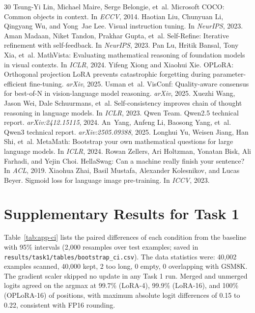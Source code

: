 \documentclass{article}
\begin{document}
\begin{thebibliography}{30}
Tsung-Yi Lin, Michael Maire, Serge Belongie, et~al. Microsoft COCO: Common objects in context. In \emph{ECCV}, 2014.
Haotian Liu, Chunyuan Li, Qingyang Wu, and Yong~Jae Lee. Visual instruction tuning. In \emph{NeurIPS}, 2023.
Aman Madaan, Niket Tandon, Prakhar Gupta, et~al. Self-Refine: Iterative refinement with self-feedback. In \emph{NeurIPS}, 2023.
Pan Lu, Hritik Bansal, Tony Xia, et~al. MathVista: Evaluating mathematical reasoning of foundation models in visual contexts. In \emph{ICLR}, 2024.
Yifeng Xiong and Xiaohui Xie. OPLoRA: Orthogonal projection LoRA prevents catastrophic forgetting during parameter-efficient fine-tuning. \emph{arXiv}, 2025.
Usman et~al. VisConf: Quality-aware consensus for best-of-N in vision-language model reasoning. \emph{arXiv}, 2025.
Xuezhi Wang, Jason Wei, Dale Schuurmans, et~al. Self-consistency improves chain of thought reasoning in language models. In \emph{ICLR}, 2023.
Qwen Team. Qwen2.5 technical report. \emph{arXiv:2412.15115}, 2024.
An~Yang, Anfeng Li, Baosong Yang, et~al. Qwen3 technical report. \emph{arXiv:2505.09388}, 2025.
Longhui Yu, Weisen Jiang, Han Shi, et~al. MetaMath: Bootstrap your own mathematical questions for large language models. In \emph{ICLR}, 2024.
Rowan Zellers, Ari Holtzman, Yonatan Bisk, Ali Farhadi, and Yejin Choi. HellaSwag: Can a machine really finish your sentence? In \emph{ACL}, 2019.
Xiaohua Zhai, Basil Mustafa, Alexander Kolesnikov, and Lucas Beyer. Sigmoid loss for language image pre-training. In \emph{ICCV}, 2023.
\end{thebibliography}

\normalsize
\appendix
\section{Supplementary Results for Task 1}
\label{app:ci}
Table~\ref{tab:app-ci} lists the paired differences of each condition from the baseline with 95\% intervals (2,000 resamples over test examples; saved in \texttt{results/task1/tables/bootstrap\_ci.csv}). The data statistics were: 40,002 examples scanned, 40,000 kept, 2 too long, 0 empty, 0 overlapping with GSM8K. The gradient scaler skipped no update in any Task 1 run. Merged and unmerged logits agreed on the argmax at 99.7\% (LoRA-4), 99.9\% (LoRA-16), and 100\% (OPLoRA-16) of positions, with maximum absolute logit differences of 0.15 to 0.22, consistent with FP16 rounding.
\end{document}
